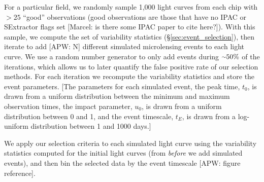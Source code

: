 \documentclass[12pt,preprint]{aastex}
\newcommand{\apwsim}{\raisebox{0.2ex}{\scriptsize$\sim$\normalsize}}
\begin{document}
For a particular field, we randomly sample 1,000 light curves from each chip with $>25$ ``good'' observations (good observations are those that have no IPAC or SExtractor flags set [Marcel: is there some IPAC paper to cite here?]). With this sample, we compute the set of variability statistics (\S\ref{sec:event_selection}), then iterate to add [APW: N] different simulated microlensing events to each light curve. We use a random number generator to only add events during $\apwsim 50\%$ of the iterations, which allows us to later quantify the false positive rate of our selection methods. For each iteration we recompute the variability statistics and store the event parameters. [The parameters for each simulated event, the peak time, $t_0$, is drawn from a uniform distribution between the minimum and maximum observation times, the impact parameter, $u_0$, is drawn from a uniform distribution between 0 and 1, and the event timescale, $t_E$, is drawn from a log-uniform distribution between 1 and 1000 days.]

We apply our selection criteria to each simulated light curve using the variability statistics computed for the initial light curves (from \textit{before} we add simulated events), and then bin the selected data by the event timescale [APW: figure reference]. 





\end{document}
